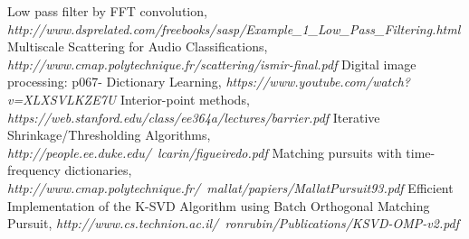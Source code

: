 \documentclass[final]{siamltexmm}
\begin{document}
\begin{thebibliography}{10}
 {\sc Low pass filter by FFT convolution}, {\em http://www.dsprelated.com/freebooks/sasp/Example\_1\_Low\_Pass\_Filtering.html}
 {\sc Multiscale Scattering for Audio Classifications}, {\em http://www.cmap.polytechnique.fr/scattering/ismir-final.pdf}
 {\sc Digital image processing: p067- Dictionary Learning}, {\em https://www.youtube.com/watch?v=XLXSVLKZE7U}
 {\sc Interior-point methods}, {\em https://web.stanford.edu/class/ee364a/lectures/barrier.pdf}
 {\sc Iterative Shrinkage/Thresholding Algorithms}, {\em http://people.ee.duke.edu/~lcarin/figueiredo.pdf}
 {\sc Matching pursuits with time-frequency dictionaries}, {\em http://www.cmap.polytechnique.fr/~mallat/papiers/MallatPursuit93.pdf}
 {\sc Efficient Implementation of the K-SVD Algorithm using Batch Orthogonal Matching Pursuit}, {\em http://www.cs.technion.ac.il/~ronrubin/Publications/KSVD-OMP-v2.pdf}
\end{thebibliography}
\end{document}
